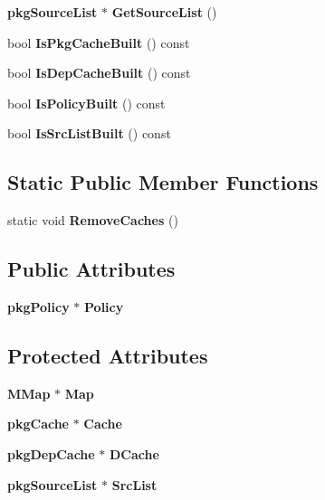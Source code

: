 \begin{DoxyCompactItemize}
\item 
{\bf pkg\-Source\-List} $\ast$ {\bfseries \-Get\-Source\-List} ()\label{classpkgCacheFile_a326a379c424f9b5c4c417718a281115f}

\item 
bool {\bfseries \-Is\-Pkg\-Cache\-Built} () const \label{classpkgCacheFile_aa6257a4f6e0e883214f9b50af37cbc10}

\item 
bool {\bfseries \-Is\-Dep\-Cache\-Built} () const \label{classpkgCacheFile_aa9edc0d158daf715ee4ead9f4c4de8af}

\item 
bool {\bfseries \-Is\-Policy\-Built} () const \label{classpkgCacheFile_a830f161a18e8ab8e73ccfc0b1ae3549d}

\item 
bool {\bfseries \-Is\-Src\-List\-Built} () const \label{classpkgCacheFile_a79dffe119e9840baa5169c5dae7a857a}

\end{DoxyCompactItemize}
\subsection*{\-Static \-Public \-Member \-Functions}
\begin{DoxyCompactItemize}
\item 
static void {\bfseries \-Remove\-Caches} ()\label{classpkgCacheFile_a86d7cc75baaa970be833d9830200a9d2}

\end{DoxyCompactItemize}
\subsection*{\-Public \-Attributes}
\begin{DoxyCompactItemize}
\item 
{\bf pkg\-Policy} $\ast$ {\bfseries \-Policy}\label{classpkgCacheFile_ab6770868fbbfaabc0888c2e440385768}

\end{DoxyCompactItemize}
\subsection*{\-Protected \-Attributes}
\begin{DoxyCompactItemize}
\item 
{\bf \-M\-Map} $\ast$ {\bfseries \-Map}\label{classpkgCacheFile_a41fdcc4129a1c81d78aad32c7bef5f73}

\item 
{\bf pkg\-Cache} $\ast$ {\bfseries \-Cache}\label{classpkgCacheFile_a200f99ff6c297b73a2e9302d95ca7a87}

\item 
{\bf pkg\-Dep\-Cache} $\ast$ {\bfseries \-D\-Cache}\label{classpkgCacheFile_a1fe619a9c0b3bc8770268fd8aae45b97}

\item 
{\bf pkg\-Source\-List} $\ast$ {\bfseries \-Src\-List}\label{classpkgCacheFile_a490173727d58a7ff97bcb583c64776a3}

\end{DoxyCompactItemize}


